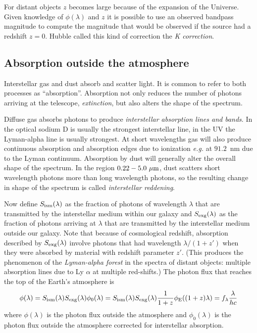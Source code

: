 For distant objects $z$ becomes large because of the expansion of the
Universe. Given knowledge of $\phi(\lambda)$ and $z$ it is possible to
use an observed bandpass magnitude to compute the magnitude that
would be observed if the source had a redshift $z=0$. Hubble called
this kind of correction the {\it K correction}. 
%
\subsection{Absorption outside the atmosphere}
Interstellar gas and dust absorb and scatter light. It is common to
refer to both processes as ``absorption''. Absorption not only reduces
the number of photons arriving at the telescope, {\it extinction}, but
also alters the shape of the spectrum.

Diffuse gas absorbs photons to produce {\it interstellar absorption
  lines and bands}. In the optical sodium D is usually the strongest
interstellar line, in the UV the Lyman-alpha line is usually
strongest. At short wavelengths gas will also produce continuous
absorption and absorption edges due to ionization {\it e.g.} at
$91.2$~nm due to the Lyman continuum. Absorption by dust will
generally alter the overall shape of the spectrum. In the region
$0.22-5.0~\mu{\rm m}$, dust scatters short wavelength photons more
than long wavelength photons, so the resulting change in shape of the
spectrum is called {\it interstellar reddening}. 

Now define $S_{\rm
  ism}(\lambda)$ as the fraction of photons of wavelength $\lambda$
that are transmitted by the interstellar medium within our galaxy and
$S_{\rm exg}(\lambda)$ as the fraction of photons arriving at
$\lambda$ that are transmitted by the interstellar medium outside our
galaxy. Note that because of cosmological redshift, absorption
described by $S_{\rm exg}(\lambda)$ involve photons that had
wavelength ${\lambda/(1+z')}$ when they were absorbed by material with
  redshift parameter $z'$. (This produces the phenomenon of the {\it
    Lyman-alpha forest} in the spectra of distant objects: multiple
  absorption lines due to Ly $\alpha$ at multiple red-shifts.) The
  photon flux that reaches the top of the Earth's atmosphere is 
\[
\phi(\lambda)=S_{\rm ism}(\lambda) S_{\rm
  exg}(\lambda)\phi_0(\lambda)=S_{\rm ism}(\lambda) S_{\rm
  exg}(\lambda)\frac{1}{1+z}\phi_{\rm E}((1+z)\lambda)=f_\lambda\frac{\lambda}{hc}
\]
where $\phi(\lambda)$ is the photon flux outside the atmosphere and
$\phi_0(\lambda)$ is the photon flux outside the atmosphere corrected
for interstellar absorption. 
%
